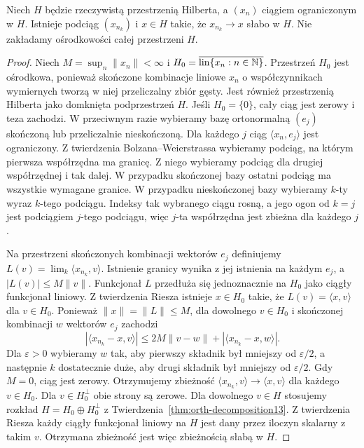 \begin{lemat}
\label{lem:hilbert-weakseq16}
Niech $H$ będzie rzeczywistą przestrzenią Hilberta,
a $(x_n)$ ciągiem ograniczonym w $H$.
Istnieje podciąg $(x_{n_k})$ i $x\in H$ takie,
że $x_{n_k}\to x$ słabo w $H$.
Nie zakładamy ośrodkowości całej przestrzeni $H$.
\end{lemat}
\begin{proof}
Niech $M=\sup_n\|x_n\|<\infty$ i
$H_0=\overline{\operatorname{lin}\{x_n:n\in\mathbb N\}}$.
Przestrzeń $H_0$ jest ośrodkowa, ponieważ skończone
kombinacje liniowe $x_n$ o współczynnikach wymiernych
tworzą w niej przeliczalny zbiór gęsty. Jest również
przestrzenią Hilberta jako domknięta podprzestrzeń $H$.
Jeśli $H_0=\{0\}$, cały ciąg jest zerowy i teza zachodzi.
W przeciwnym razie wybieramy bazę ortonormalną $(e_j)$
skończoną lub przeliczalnie nieskończoną.
Dla każdego $j$ ciąg $\langle x_n,e_j\rangle$ jest ograniczony.
Z twierdzenia Bolzana--Weierstrassa wybieramy podciąg,
na którym pierwsza współrzędna ma granicę. Z niego
wybieramy podciąg dla drugiej współrzędnej i tak dalej.
W przypadku skończonej bazy ostatni podciąg ma
wszystkie wymagane granice. W przypadku nieskończonej
bazy wybieramy $k$-ty wyraz $k$-tego podciągu.
Indeksy tak wybranego ciągu rosną, a jego ogon
od $k=j$ jest podciągiem $j$-tego podciągu, więc
$j$-ta współrzędna jest zbieżna dla każdego $j$.

Na przestrzeni skończonych kombinacji wektorów $e_j$
definiujemy $L(v)=\lim_k\langle x_{n_k},v\rangle$.
Istnienie granicy wynika z jej istnienia na każdym $e_j$,
a $|L(v)|\le M\|v\|$. Funkcjonał $L$ przedłuża się
jednoznacznie na $H_0$ jako ciągły funkcjonał liniowy.
Z twierdzenia Riesza istnieje $x\in H_0$ takie,
że $L(v)=\langle x,v\rangle$ dla $v\in H_0$.
Ponieważ $\|x\|=\|L\|\le M$, dla dowolnego $v\in H_0$
i skończonej kombinacji $w$ wektorów $e_j$ zachodzi
\[
 |\langle x_{n_k}-x,v\rangle|
 \le 2M\|v-w\|+|\langle x_{n_k}-x,w\rangle|.
\]
Dla $\varepsilon>0$ wybieramy $w$ tak, aby pierwszy
składnik był mniejszy od $\varepsilon/2$, a następnie
$k$ dostatecznie duże, aby drugi składnik był mniejszy
od $\varepsilon/2$. Gdy $M=0$, ciąg jest zerowy.
Otrzymujemy zbieżność $\langle x_{n_k},v\rangle
\to\langle x,v\rangle$ dla każdego $v\in H_0$.
Dla $v\in H_0^\perp$ obie strony są zerowe.
Dla dowolnego $v\in H$ stosujemy rozkład
$H=H_0\oplus H_0^\perp$ z Twierdzenia~\ref{thm:orth-decomposition13}.
Z twierdzenia Riesza każdy ciągły funkcjonał liniowy
na $H$ jest dany przez iloczyn skalarny z takim $v$.
Otrzymana zbieżność jest więc zbieżnością słabą w $H$.
\end{proof}

